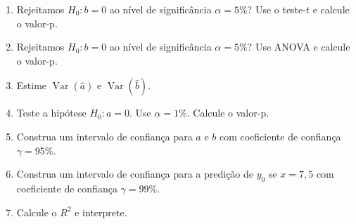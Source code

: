 \documentclass[12pt, a4paper]{article}
\DeclareMathOperator {\vari}{Var}
\begin{document}
\begin{enumerate}
\begin{enumerate}
		\item Rejeitamos $H_0: b = 0$ ao nível de significância $\alpha=5\%$? Use o teste-$t$ e calcule o valor-p.
		\item Rejeitamos $H_0: b = 0$ ao nível de significância $\alpha=5\%$? Use ANOVA e calcule o valor-p.
		\item Estime $\vari\left(\hat{a}\right)$  e $\vari\left(\hat{b}\right)$.
		\item Teste a hipótese $H_0: a = 0$. Use $\alpha = 1\%$. Calcule o valor-p.
		\item Construa um intervalo de confiança para $a$ e $b$ com coeficiente de confiança $\gamma=95\%$.
		\item Construa um intervalo de confiança para a predição de $y_0$ se $x=7,5$ com coeficiente de confiança $\gamma=99\%$.
		\item Calcule o $R^2$ e interprete.
	\end{enumerate}


\end{enumerate}
\end{document}
